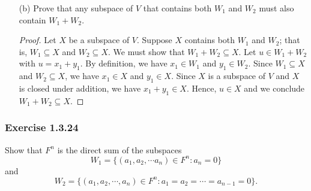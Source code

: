 \begin{enumerate}
\begin{proof}
\begin{enumerate}
                \begin{align*}
                    cu &= c(x_{1} + y_{1}) \\
                       &= cx_{1} + cy_{1} \in W_{1} + W_{2}.
                \end{align*}
        \end{enumerate}
        Hence, \( W_{1} + W_{2}  \) is a subspace of \( V  \).
        \end{proof}
    \item[(b)] Prove that any subspace of \( V  \) that contains both \( W_{1}  \) and \( W_{2}  \) must also contain \( W_{1} + W_{2} \).
        \begin{proof}
            Let \( X \) be a subspace of \( V  \). Suppose \( X  \) contains both \( W_{1}  \) and \( W_{2}  \); that is, \( W_{1} \subseteq X  \) and \( W_{2} \subseteq X  \). We must show that \( W_{1} + W_{2} \subseteq X \). Let \( u \in W_{1} + W_{2}  \) with \( u = x_{1} + y_{1} \). By definition, we have \( x_{1} \in W_{1}  \) and \( y_{1} \in W_{2}  \). Since \( W_{1} \subseteq X  \) and \( W_{2} \subseteq X  \), we have \( x_{1} \in X  \) and \( y_{1} \in X  \). Since \( X  \) is a subspace of \( V  \) and \( X  \) is closed under addition, we have \( x_{1} + y_{1} \in X  \). Hence, \( u \in X  \) and we conclude \( W_{1}  + W_{2} \subseteq X  \).
        \end{proof}
\end{enumerate}

\subsubsection{Exercise 1.3.24} Show that \( F^{n}  \) is the direct sum of the subspaces 
\[  W_{1} = \{ (a_{1} , a_{2} , \cdots a_{n}) \in F^{n} : a_{n} = 0  \}  \]
and 
\[  W_{2} = \{ (a_{1} , a_{2} , \cdots, a_{n}) \in F^{n} : a_{1} = a_{2} = \cdots = a_{n-1} = 0  \}. \]

